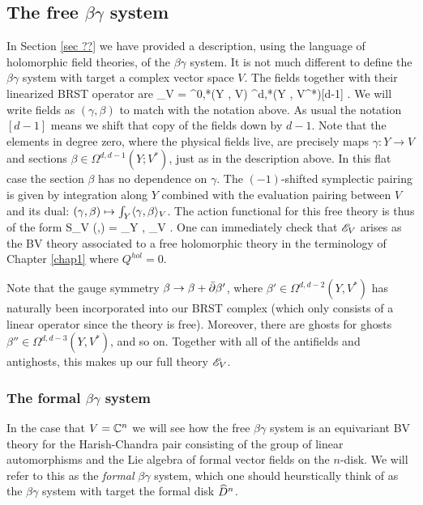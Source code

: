 \documentclass[10pt]{amsart}
\begin{document}
\subsection{The free $\beta\gamma$ system}

In Section \ref{sec ??} we have provided a description, using the language of holomorphic field theories, of the $\beta\gamma$ system.
It is not much different to define the $\beta\gamma$ system with target a complex vector space $V$. 
The fields together with their linearized BRST operator are
\ben
\sE_V = \Omega^{0,*}(Y , V) \oplus \Omega^{d,*}(Y , V^*)[d-1] .
\een
We will write fields as $(\gamma,\beta)$ to match with the notation above.
As usual the notation $[d-1]$ means we shift that copy of the fields down by $d-1$. 
Note that the elements in degree zero, where the physical fields live, are precisely maps $\gamma : Y \to V$ and sections $\beta \in\Omega^{d,d-1} (Y ; V^*)$, just as in the description above. 
In this flat case the section $\beta$ has no dependence on $\gamma$.
The $(-1)$-shifted symplectic pairing is given by integration along $Y$ combined with the evaluation pairing between $V$ and its dual: $(\gamma, \beta) \mapsto \int_Y \langle\gamma, \beta\rangle_V$. 
The action functional for this free theory is thus of the form
\ben
S_V (\beta,\gamma) = \int_Y \<\beta, \dbar \gamma\>_{V} .
\een
One can immediately check that $\mathscr E_V$ arises as the BV theory associated to a free holomorphic theory in the terminology of Chapter \ref{chap1} where $Q^{hol} = 0$. 

Note that the gauge symmetry $\beta \to \beta + \Bar{\partial} \beta'$, where $\beta' \in \Omega^{d,d-2} (Y, V^*)$ has naturally been incorporated into our BRST complex (which only consists of a linear operator since the theory is free). 
Moreover, there are ghosts for ghosts $\beta'' \in \Omega^{d,d-3}(Y , V^*)$, and so on.
Together with all of the antifields and antighosts, this makes up our full theory $\mathscr E_V$. 

\subsubsection{The formal $\beta\gamma$ system}

In the case that $V = \mathbb C^n$ we will see how the free $\beta\gamma$ system is an equivariant BV theory for the Harish-Chandra pair consisting of the group of linear automorphisms and the Lie algebra of formal vector fields on the $n$-disk.
We will refer to this as the {\em formal} $\beta\gamma$ system, which one should heurstically think of as the $\beta\gamma$ system with target the formal disk $\widehat{D}^n$.
\end{document}
